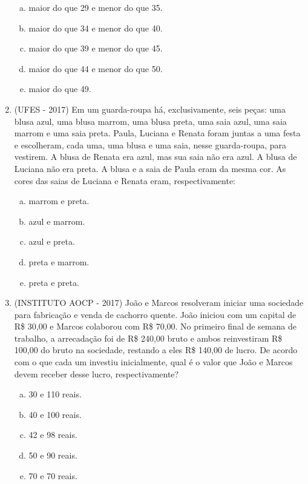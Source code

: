 \begin{enumerate}
\begin{enumerate}[a)]
\item maior do que 29 e menor do que 35.
\item maior do que 34 e menor do que 40.
\item maior do que 39 e menor do que 45.
\item maior do que 44 e menor do que 50.
\item maior do que 49.
\end{enumerate}

\item (UFES - 2017) Em um guarda-roupa há, exclusivamente, seis peças: uma blusa azul, uma blusa marrom, uma blusa preta, uma saia azul, uma saia marrom e uma saia preta. Paula, Luciana e Renata foram juntas a uma festa e escolheram, cada uma, uma blusa e uma saia, nesse guarda-roupa, para vestirem. A blusa de Renata era azul, mas sua saia não era azul. A blusa de Luciana não era preta. A blusa e a saia de Paula eram da mesma cor. As cores das saias de Luciana e Renata eram, respectivamente:
\begin{multicols}{2}
\begin{enumerate}[a)]
\item marrom e preta.
\item azul e marrom.
\item azul e preta.
\item preta e marrom.
\item preta e preta.
\end{enumerate}
\end{multicols}

\item (INSTITUTO AOCP - 2017) João e Marcos resolveram iniciar uma sociedade para fabricação e venda de cachorro quente. João iniciou com um capital de R\$ 30,00 e Marcos colaborou com R\$ 70,00. No primeiro final de semana de trabalho, a arrecadação foi de R\$ 240,00 bruto e ambos reinvestiram R\$ 100,00 do bruto na sociedade, restando a eles R\$ 140,00 de lucro. De acordo com o que cada um investiu inicialmente, qual é o valor que João e Marcos devem receber desse lucro, respectivamente?
\begin{multicols}{2}
\begin{enumerate}[a)]
\item 30 e 110 reais.
\item 40 e 100 reais.
\item 42 e 98 reais.
\item 50 e 90 reais.
\item 70 e 70 reais.
\end{enumerate}
\end{multicols}


\end{enumerate}

